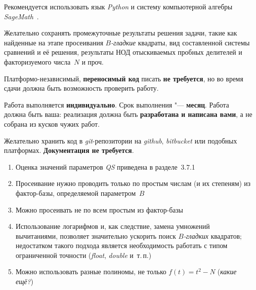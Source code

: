 \documentclass{ca-capstone}
\begin{document}
Рекомендуется использовать язык \emph{Python} и систему компьютерной алгебры
\emph{SageMath}~\cite{sagemath}.

Желательно сохранять промежуточные результаты решения задачи, такие как найденные на этапе
просеивания \emph{$B$-гладкие} квадраты, вид составленной системы сравнений и её решения,
результаты НОД отыскиваемых пробных делителей и факторизуемого числа~$N$ и проч.

Платформо-независимый, \textbf{переносимый код} писать \textbf{не требуется}, но во время сдачи
должна быть возможность проверить работу.

\schedule
Работа выполняется \textbf{индивидуально}. Срок выполнения "--- \textbf{месяц}. Работа должна
быть ваша: реализация должна быть \textbf{разработана и написана вами}, а не собрана из кусков
чужих работ.

Желательно хранить код в \emph{git}-репозитории на \emph{github}, \emph{bitbucket} или подобных
платформах. \textbf{Документация не требуется}.

\remarks
\begin{enumerate}
  \item Оценка значений параметров \emph{QS} приведена в разделе~3.7.1~\cite{hps}
  \item Просеивание нужно проводить только по простым числам (и их степеням) из фактор-базы,
    определяемой параметром~$B$
  \item Можно просеивать не по всем простым из фактор-базы
  \item Использование логарифмов и, как следствие, замена умножений вычитаниями, позволяет
    значительно ускорить поиск \emph{$B$-гладких} квадратов; недостатком такого подхода является
    необходимость работать с типом ограниченной точности (\emph{float}, \emph{double} и~т.\,п.)
  \item Можно использовать разные полиномы, не только $f(t) = t^2 - N$ (\emph{какие ещё?})
\end{enumerate}

\end{document}
